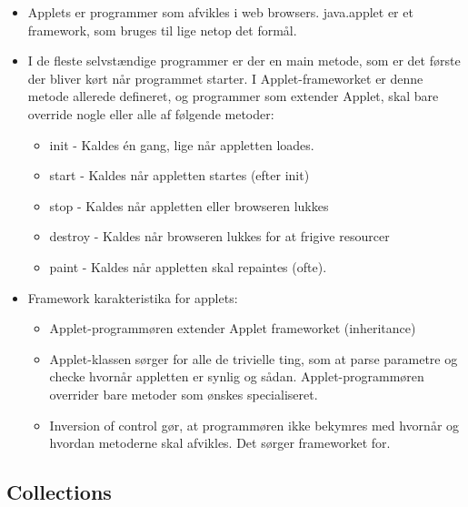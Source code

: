 \begin{itemize}
  \item Applets er programmer som afvikles i web browsers. java.applet er et framework, som bruges til lige netop det formål.
  \item I de fleste selvstændige programmer er der en main metode, som er det første der bliver kørt når programmet starter. I Applet-frameworket er denne metode allerede defineret, og programmer som extender Applet, skal bare override nogle eller alle af følgende metoder:
  \begin{itemize}
    \item init - Kaldes én gang, lige når appletten loades.
    \item start - Kaldes når appletten startes (efter init)
    \item stop - Kaldes når appletten eller browseren lukkes
    \item destroy - Kaldes når browseren lukkes for at frigive resourcer
    \item paint - Kaldes når appletten skal repaintes (ofte).
  \end{itemize}

  \item Framework karakteristika for applets:
  \begin{itemize}
    \item Applet-programmøren extender Applet frameworket (inheritance)
    \item Applet-klassen sørger for alle de trivielle ting, som at parse parametre og checke hvornår appletten er synlig og sådan. Applet-programmøren overrider bare metoder som ønskes specialiseret.
    \item Inversion of control gør, at programmøren ikke bekymres med hvornår og hvordan metoderne skal afvikles. Det sørger frameworket for.
  \end{itemize}
\end{itemize}

\subsection{Collections}

